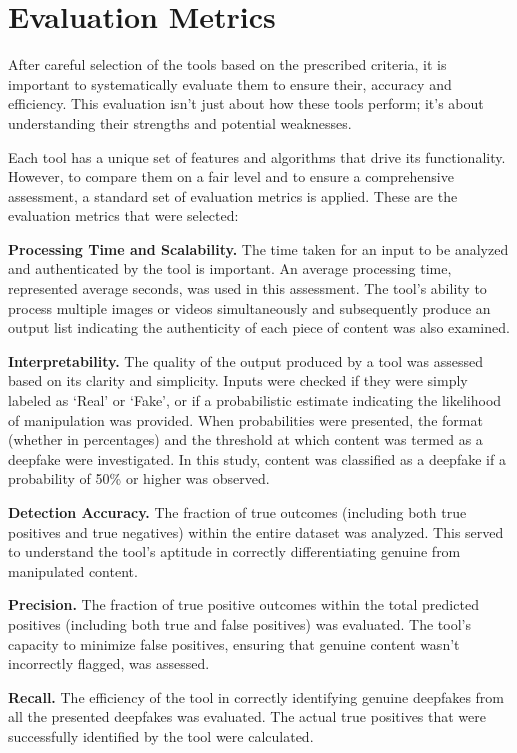 \section{Evaluation Metrics}
After careful selection of the tools based on the prescribed criteria, it is
important to systematically evaluate them to ensure their, accuracy
and efficiency. This evaluation isn't just about how these tools perform; it's
about understanding their strengths and potential weaknesses.

Each tool has a unique set of features and algorithms that drive its functionality.
However, to compare them on a fair level and to ensure a comprehensive
assessment, a standard set of evaluation metrics is applied. These are the evaluation
metrics that were selected:

\textbf{Processing Time and Scalability.} The time taken for an input to be analyzed
and authenticated by the tool is important. An average processing time, represented
average seconds, was used in this assessment. The tool's ability to process multiple
images or videos simultaneously and subsequently produce an output list indicating
the authenticity of each piece of content was also examined.

\textbf{Interpretability.} The quality of the output produced by a tool was assessed
based on its clarity and simplicity. Inputs were checked if they were simply labeled
as `Real' or `Fake', or if a probabilistic estimate indicating the likelihood of
manipulation was provided. When probabilities were presented, the format
(whether in percentages) and the threshold at which content was termed as a deepfake
were investigated. In this study, content was classified as a deepfake if a
probability of 50\% or higher was observed.

\textbf{Detection Accuracy.} The fraction of true outcomes (including both true
positives and true negatives) within the entire dataset was analyzed. This served
to understand the tool's aptitude in correctly differentiating genuine from manipulated
content.

\textbf{Precision.} The fraction of true positive outcomes within the total predicted
positives (including both true and false positives) was evaluated. The tool's capacity
to minimize false positives, ensuring that genuine content wasn't incorrectly flagged,
was assessed.

\textbf{Recall.} The efficiency of the tool in correctly identifying genuine deepfakes
from all the presented deepfakes was evaluated. The actual true positives that were
successfully identified by the tool were calculated.

